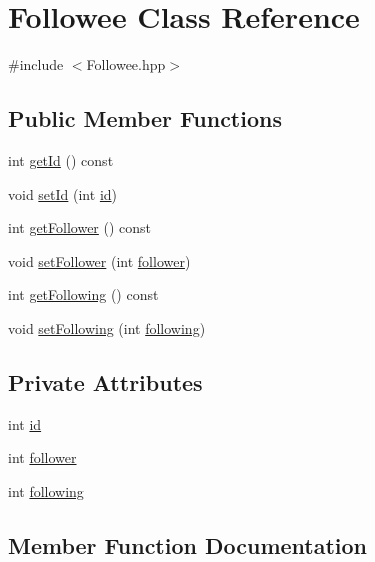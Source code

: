 \hypertarget{class_followee}{}\section{Followee Class Reference}
\label{class_followee}


{\ttfamily \#include $<$Followee.\+hpp$>$}

\subsection*{Public Member Functions}
\begin{DoxyCompactItemize}
\item 
int \hyperlink{class_followee_a2609f8b97c1463c32bef82efb33f05fb}{get\+Id} () const
\item 
void \hyperlink{class_followee_a21f7b67430875a872465c30ee99f0c16}{set\+Id} (int \hyperlink{class_followee_adb7f286786c98683b50f1749c911a758}{id})
\item 
int \hyperlink{class_followee_a6a3e661936f7ad976e33e56f0b53aa36}{get\+Follower} () const
\item 
void \hyperlink{class_followee_a3a4ce9c9c0bdd80815f32fd26578a538}{set\+Follower} (int \hyperlink{class_followee_aa94022443f6b3f3703ad9dc423b53582}{follower})
\item 
int \hyperlink{class_followee_abb96db636d36246f2b3043d3dd9fa8ca}{get\+Following} () const
\item 
void \hyperlink{class_followee_a51c0c4c4452e7d4ed4ae4bb34687bcfe}{set\+Following} (int \hyperlink{class_followee_acb8bf9bcbdf308e143a354ffc42ea75b}{following})
\end{DoxyCompactItemize}
\subsection*{Private Attributes}
\begin{DoxyCompactItemize}
\item 
int \hyperlink{class_followee_adb7f286786c98683b50f1749c911a758}{id}
\item 
int \hyperlink{class_followee_aa94022443f6b3f3703ad9dc423b53582}{follower}
\item 
int \hyperlink{class_followee_acb8bf9bcbdf308e143a354ffc42ea75b}{following}
\end{DoxyCompactItemize}


\subsection{Member Function Documentation}
\mbox{\label{class_followee_a6a3e661936f7ad976e33e56f0b53aa36}} 
